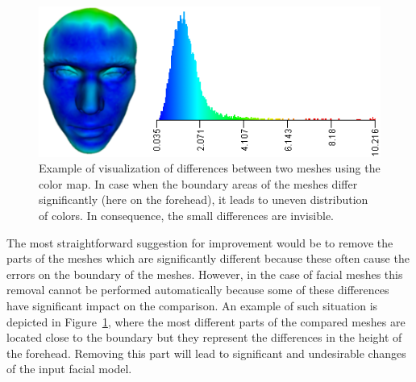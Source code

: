 \documentclass[final,5p,times]{elsarticle}
\begin{document}
\begin{figure}[htb]
	\centering
  \includegraphics[width=0.9\linewidth]{pictures/colormap.png}
  \caption{\label{fig:colormap} Example of visualization of differences between two meshes using the color map. In case when the boundary areas of the meshes differ significantly (here on the forehead), it leads to uneven distribution of colors. In consequence, the small differences are invisible.}
\end{figure}

The most straightforward suggestion for improvement would be to remove the parts of the meshes which are significantly different because these often cause the errors on the boundary of the meshes.
However, in the case of facial meshes this removal cannot be performed automatically because some of these differences have significant impact on the comparison.
An example of such situation is depicted in Figure~\ref{fig:colormap}, where the most different parts of the compared meshes are located close to the boundary but they represent the differences in the height of the forehead.
Removing this part will lead to significant and undesirable changes of the input facial model.
\end{document}
